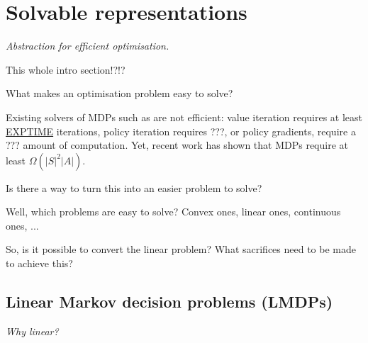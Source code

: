 \section{Solvable representations}

\begin{displayquote}
  \textit{Abstraction for efficient optimisation.}
\end{displayquote}

{\color{red}This whole intro section!?!?}

What makes an optimisation problem easy to solve?

Existing solvers of MDPs such as are not efficient: value iteration requires at
least \href{https://en.wikipedia.org/wiki/EXPTIME}{EXPTIME} iterations,
policy iteration requires ???, or policy gradients,
require a ??? amount of computation.
Yet, recent work \cite{} has shown that MDPs require at least $\Omega(|S|^2|A|).$

Is there a way to turn this into an easier problem to solve?


Well, which problems are easy to solve? Convex ones, linear ones, continuous ones, ... \cite{ODonoghue2012a}

So, is it possible to convert the
 linear problem? What sacrifices need to be made to
achieve this?

\subsection{Linear Markov decision problems (LMDPs)}

\begin{displayquote}
\textit{Why linear?}
\end{displayquote}


%

